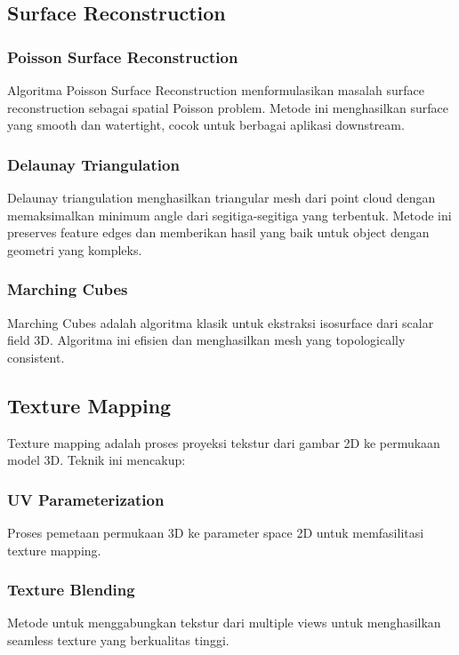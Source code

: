 \documentclass[12pt,a4paper]{article}
\begin{document}
\subsection{Surface Reconstruction}

\subsubsection{Poisson Surface Reconstruction}

Algoritma Poisson Surface Reconstruction menformulasikan masalah surface reconstruction sebagai spatial Poisson problem. Metode ini menghasilkan surface yang smooth dan watertight, cocok untuk berbagai aplikasi downstream.

\subsubsection{Delaunay Triangulation}

Delaunay triangulation menghasilkan triangular mesh dari point cloud dengan memaksimalkan minimum angle dari segitiga-segitiga yang terbentuk. Metode ini preserves feature edges dan memberikan hasil yang baik untuk object dengan geometri yang kompleks.

\subsubsection{Marching Cubes}

Marching Cubes adalah algoritma klasik untuk ekstraksi isosurface dari scalar field 3D. Algoritma ini efisien dan menghasilkan mesh yang topologically consistent.

\subsection{Texture Mapping}

Texture mapping adalah proses proyeksi tekstur dari gambar 2D ke permukaan model 3D. Teknik ini mencakup:

\subsubsection{UV Parameterization}
Proses pemetaan permukaan 3D ke parameter space 2D untuk memfasilitasi texture mapping.

\subsubsection{Texture Blending}
Metode untuk menggabungkan tekstur dari multiple views untuk menghasilkan seamless texture yang berkualitas tinggi.
\end{document}

